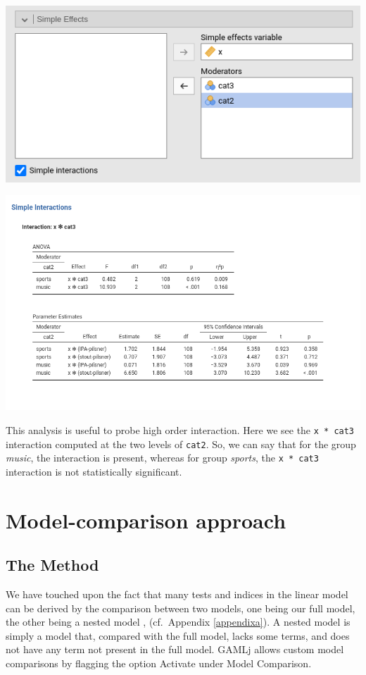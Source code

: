 \documentclass[
]{book}
\begin{document}
\includegraphics[width=7.88in]{bookletpics/2_ancova_input6}

\includegraphics[width=11.15in]{bookletpics/2_ancova_output6}

This analysis is useful to probe high order interaction. Here we see the \texttt{x\ *\ cat3} interaction computed at the two levels of \texttt{cat2}. So, we can say that for the group \emph{music}, the interaction is present, whereas for group \emph{sports}, the \texttt{x\ *\ cat3} interaction is not statistically significant.

\hypertarget{model-comparison-approach}{%
\section{Model-comparison approach}\label{model-comparison-approach}}

\hypertarget{the-method}{%
\subsection{The Method}\label{the-method}}

We have touched upon the fact that many tests and indices in the linear model can be derived by the comparison between two models, one being our full model, the other being a nested model \citep{judd2017data}, (cf.~Appendix \ref{appendixa}). A nested model is simply a model that, compared with the full model, lacks some terms, and does not have any term not present in the full model. {GAMLj} allows custom model comparisons by flagging the option {Activate} under {Model Comparison}.
\end{document}
